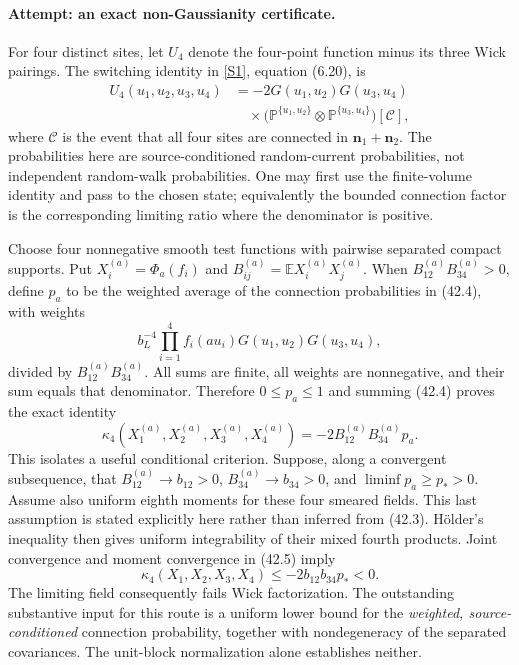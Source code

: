 \documentclass[11pt,a4paper]{article}
\newcommand{\E}{\mathbb{E}}
\newcommand{\sref}[2]{\hyperlink{source:#1:#2}{[S#2]}}
\numberwithin{equation}{section}
\begin{document}
\paragraph{Attempt: an exact non-Gaussianity certificate.}
For four distinct sites, let $U_4$ denote the four-point function minus its
three Wick pairings. The switching identity in \sref{statement}{1}, equation
(6.20), is
\[
 \begin{aligned}
 U_4(u_1,u_2,u_3,u_4)
 &=-2G(u_1,u_2)G(u_3,u_4)\\
 &\quad\times
 \bigl(\mathbb P^{\{u_1,u_2\}}\!\otimes
   \mathbb P^{\{u_3,u_4\}}\bigr)[\mathcal C],
 \end{aligned}
 \tag{42.4}
\]
where $\mathcal C$ is the event that all four sites are connected in
$\mathbf n_1+\mathbf n_2$. The probabilities here are source-conditioned random-current probabilities,
not independent random-walk probabilities. One may first use the finite-volume
identity and pass to the chosen state; equivalently the bounded connection
factor is the corresponding limiting ratio where the denominator is positive.

Choose four nonnegative smooth test functions with pairwise separated
compact supports. Put $X_i^{(a)}=\Phi_a(f_i)$ and
$B_{ij}^{(a)}=\E X_i^{(a)}X_j^{(a)}$. When
$B_{12}^{(a)}B_{34}^{(a)}>0$, define $p_a$ to be the weighted average of the
connection probabilities in (42.4), with weights
\[
 b_L^{-4}\prod_{i=1}^4 f_i(au_i)G(u_1,u_2)G(u_3,u_4),
\]
divided by $B_{12}^{(a)}B_{34}^{(a)}$. All sums are finite, all weights are
nonnegative, and their sum equals that denominator. Therefore $0\le p_a\le1$
and summing (42.4) proves the exact identity
\[
 \kappa_4(X_1^{(a)},X_2^{(a)},X_3^{(a)},X_4^{(a)})
       =-2B_{12}^{(a)}B_{34}^{(a)}p_a. \tag{42.5}
\]
This isolates a useful conditional criterion. Suppose, along a convergent
subsequence, that $B_{12}^{(a)}\to b_{12}>0$,
$B_{34}^{(a)}\to b_{34}>0$, and $\liminf p_a\ge p_*>0$.
Assume also uniform eighth moments for these four smeared fields. This last
assumption is stated explicitly here rather than inferred from (42.3).
H\"older's inequality then gives uniform integrability of their mixed
fourth products. Joint convergence and moment convergence in (42.5) imply
\[
 \kappa_4(X_1,X_2,X_3,X_4)\le-2b_{12}b_{34}p_*<0.
 \tag{42.6}
\]
The limiting field consequently fails Wick factorization. The outstanding
substantive input for this route is a uniform lower bound for the
\emph{weighted, source-conditioned} connection probability, together with
nondegeneracy of the separated covariances. The unit-block normalization
alone establishes neither.
\end{document}
